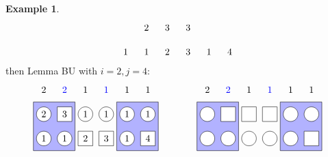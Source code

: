 \documentclass[reqno]{amsart}
\newcommand{\0}{\phantom{c}}
\theoremstyle{plain}
\theoremstyle{definition}
\newtheorem{example}[thm]{Example}
\numberwithin{equation}{section}
\begin{document}
\begin{example}
\[\begin{tikzpicture}[scale=0.9]
  \foreach \i in {2} { \node at (\i*\sc,\ll) {$2$}; }
  \foreach \i in {3,4} { \node at (\i*\sc,\ll) {$3$}; }
  \foreach \i in {1,2,5} { \node at (\i*\sc,\l) {$1$}; }
  \foreach \i in {3} { \node at (\i*\sc,\l) {$2$}; }
  \foreach \i in {4} { \node at (\i*\sc,\l) {$3$}; }
  \foreach \i in {6} { \node at (\i*\sc,\l) {$4$}; }
\end{tikzpicture}
\]
then Lemma BU with $i=2, j=4$:
\[
\begin{tikzpicture}[scale=0.9]
  \def\sc{0.85}   %
  \def\lll{3}  %
  \def\ll{2}   %
  \def\l{1}   %
  \draw[fill=blue!30] (0.5*\sc,\l-.5) rectangle(2.5*\sc,\ll+.5);
  \draw[fill=blue!30] (4.5*\sc,\l-.5) rectangle(6.5*\sc,\ll+.5);
  \foreach \i in {1,3,4,5,6} { \draw[fill=white] (\i*\sc,\ll) circle (0.3); }
  \foreach \i in {2} { \draw[fill=white] (\i*\sc-.3,\ll-.3) rectangle +(0.6,+0.6); }
  \foreach \i in {1,2,5} { \draw[fill=white] (\i*\sc,\l) circle (0.3); }
  \foreach \i in {3,4,6} { \draw[fill=white] (\i*\sc-.3,\l-.3) rectangle +(0.6,+0.6); }
  \node[blue] at (2*\sc,\lll) {$2$};
  \node[blue] at (4*\sc,\lll) {$1$};
  \foreach \i in {3,5,6} { \node at (\i*\sc,\lll) {$1$}; }
  \foreach \i in {1} { \node at (\i*\sc,\lll) {$2$}; }
  \foreach \i in {3,4,5,6} { \node at (\i*\sc,\ll) {$1$}; }
  \foreach \i in {1} { \node at (\i*\sc,\ll) {$2$}; }
  \foreach \i in {2} { \node at (\i*\sc,\ll) {$3$}; }
  \foreach \i in {1,2,5} { \node at (\i*\sc,\l) {$1$}; }
  \foreach \i in {3} { \node at (\i*\sc,\l) {$2$}; }
  \foreach \i in {4} { \node at (\i*\sc,\l) {$3$}; }
  \foreach \i in {6} { \node at (\i*\sc,\l) {$4$}; }
\end{tikzpicture}
\hspace{40pt}
\begin{tikzpicture}[scale=0.9]
  \def\sc{0.85}   %
  \def\lll{3}  %
  \def\ll{2}   %
  \def\l{1}   %
  \draw[fill=blue!30] (0.5*\sc,\l-.5) rectangle(2.5*\sc,\ll+.5);
  \draw[fill=blue!30] (4.5*\sc,\l-.5) rectangle(6.5*\sc,\ll+.5);
  \foreach \i in {1,5,6} { \draw[fill=white] (\i*\sc,\ll) circle (0.3); }
  \foreach \i in {2,3,4} { \draw[fill=white] (\i*\sc-.3,\ll-.3) rectangle +(0.6,+0.6); }
  \foreach \i in {1,2,3,4,5} { \draw[fill=white] (\i*\sc,\l) circle (0.3); }
  \foreach \i in {6} { \draw[fill=white] (\i*\sc-.3,\l-.3) rectangle +(0.6,+0.6); }
  \node[blue] at (2*\sc,\lll) {$2$};
  \node[blue] at (4*\sc,\lll) {$1$};
  \foreach \i in {3,5,6} { \node at (\i*\sc,\lll) {$1$}; }
  \foreach \i in {1} { \node at (\i*\sc,\lll) {$2$}; }

\end{tikzpicture}\]
\end{example}
\end{document}
